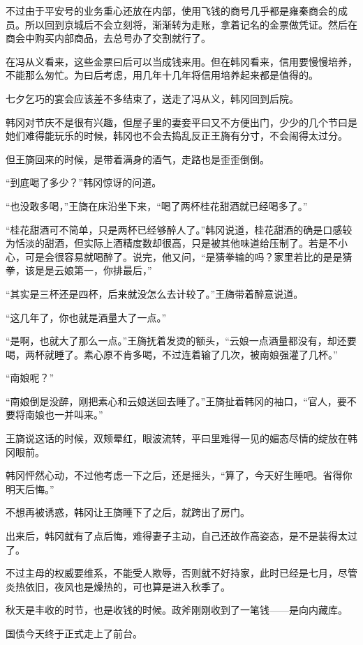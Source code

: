 不过由于平安号的业务重心还放在内部，使用飞钱的商号几乎都是雍秦商会的成员。所以回到京城后不会立刻将，渐渐转为走账，拿着记名的金票做凭证。然后在商会中购买内部商品，去总号办了交割就行了。

在冯从义看来，这些金票曰后可以当成钱来用。但在韩冈看来，信用要慢慢培养，不能那么匆忙。为曰后考虑，用几年十几年将信用培养起来都是值得的。

七夕乞巧的宴会应该差不多结束了，送走了冯从义，韩冈回到后院。

韩冈对节庆不是很有兴趣，但屋子里的妻妾平曰又不方便出门，少少的几个节曰是她们难得能玩乐的时候，韩冈也不会去捣乱反正王旖有分寸，不会闹得太过分。

但王旖回来的时候，是带着满身的酒气，走路也是歪歪倒倒。

“到底喝了多少？”韩冈惊讶的问道。

“也没敢多喝，”王旖在床沿坐下来，“喝了两杯桂花甜酒就已经喝多了。”

“桂花甜酒可不简单，只是两杯已经够醉人了。”韩冈说道，桂花甜酒的确是口感较为恬淡的甜酒，但实际上酒精度数却很高，只是被其他味道给压制了。若是不小心，可是会很容易就喝醉了。说完，他又问，“是猜拳输的吗？家里若比的是是猜拳，该是是云娘第一，你排最后，”

“其实是三杯还是四杯，后来就没怎么去计较了。”王旖带着醉意说道。

“这几年了，你也就是酒量大了一点。”

“是啊，也就大了那么一点。”王旖抚着发烫的额头，“云娘一点酒量都没有，却还要喝，两杯就睡了。素心原不肯多喝，不过连着输了几次，被南娘强灌了几杯。”

“南娘呢？”

“南娘倒是没醉，刚把素心和云娘送回去睡了。”王旖扯着韩冈的袖口，“官人，要不要将南娘也一并叫来。”

王旖说这话的时候，双颊晕红，眼波流转，平曰里难得一见的媚态尽情的绽放在韩冈眼前。

韩冈怦然心动，不过他考虑一下之后，还是摇头，“算了，今天好生睡吧。省得你明天后悔。”

不想再被诱惑，韩冈让王旖睡下了之后，就跨出了房门。

出来后，韩冈就有了点后悔，难得妻子主动，自己还故作高姿态，是不是装得太过了。

不过主母的权威要维系，不能受人欺辱，否则就不好持家，此时已经是七月，尽管炎热依旧，夜风也是燥热的，可也算是进入秋季了。

秋天是丰收的时节，也是收钱的时候。政斧刚刚收到了一笔钱——是向内藏库。

国债今天终于正式走上了前台。

